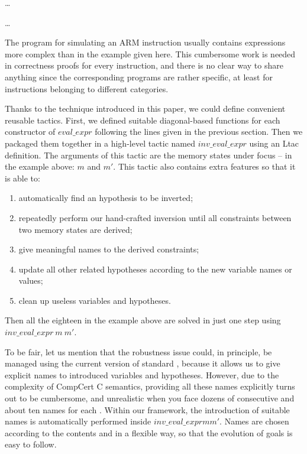 \medskip
\dots \\

\dots
\medskip

The program for simulating an ARM instruction 
usually contains expressions more complex than in the
example given here.
This cumbersome work is needed in correctness proofs for every instruction,
and there is no clear way to share anything since
the corresponding programs are rather specific,
at least for instructions belonging to different categories.

Thanks to the technique introduced in this paper,
we could define convenient reusable tactics.
First, we defined suitable diagonal-based functions for each
constructor of $eval\_expr$ following the lines given in the
previous section.
Then we packaged them together in a high-level tactic named 
$inv\_eval\_expr$ using an Ltac definition. The arguments of this
tactic are the memory states under focus --
in the example above: $m$ and $m'$.
This tactic also contains extra features so that
it is able to:
%
\begin{enumerate}
\item automatically find an hypothesis to be inverted;
\item repeatedly perform our hand-crafted inversion until all constraints
  between two memory states are derived;
\item give meaningful names to the derived constraints;
\item update all other related hypotheses according to the new 
  variable names or values;
\item clean up useless variables and hypotheses.
\end{enumerate}
%
Then all the eighteen \inversion in the example above are solved in just
one step using $inv\_eval\_expr~m~m'$.

To be fair, let us mention that the robustness issue could,
in principle, be managed using the current version of standard \inversion,
because it allows us 
to give explicit names to introduced variables and hypotheses.
However, due to the complexity of CompCert C semantics, 
providing all these names explicitly turns out to be cumbersome,
and unrealistic when you face dozens of consecutive \inversion 
and about ten names for each \inversion.
Within our framework,
the introduction of suitable names 
is automatically performed inside $inv\_eval\_expr m m'$.
Names are chosen according to the contents and in a flexible way, 
so that the evolution of goals is easy to follow.

